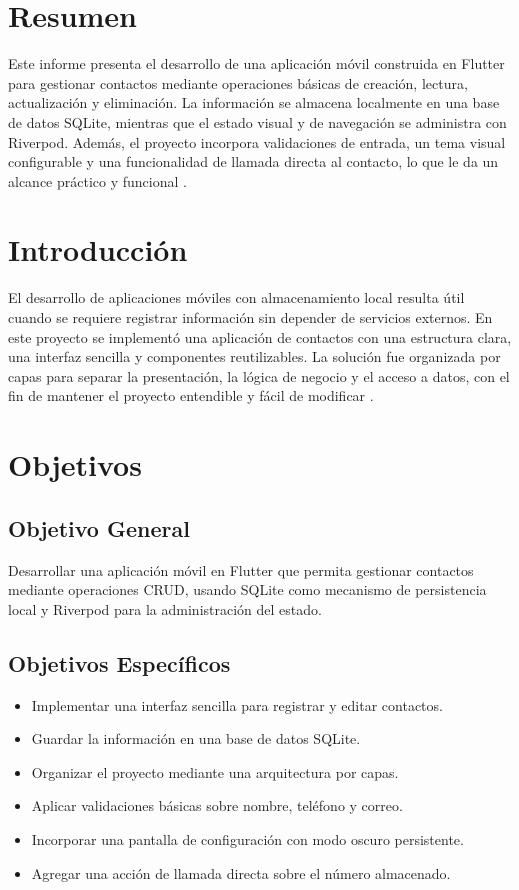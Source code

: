\documentclass[12pt,a4paper]{article}
\begin{document}
\tableofcontents
\newpage
\listoffigures
\newpage

\section{Resumen}
Este informe presenta el desarrollo de una aplicación móvil construida en Flutter para gestionar contactos mediante operaciones básicas de creación, lectura, actualización y eliminación. La información se almacena localmente en una base de datos SQLite, mientras que el estado visual y de navegación se administra con Riverpod. Además, el proyecto incorpora validaciones de entrada, un tema visual configurable y una funcionalidad de llamada directa al contacto, lo que le da un alcance práctico y funcional \citep{flutter,sqlite,riverpod}.

\section{Introducción}
El desarrollo de aplicaciones móviles con almacenamiento local resulta útil cuando se requiere registrar información sin depender de servicios externos. En este proyecto se implementó una aplicación de contactos con una estructura clara, una interfaz sencilla y componentes reutilizables. La solución fue organizada por capas para separar la presentación, la lógica de negocio y el acceso a datos, con el fin de mantener el proyecto entendible y fácil de modificar \citep{flutter,sqlite}.

\section{Objetivos}
\subsection{Objetivo General}
Desarrollar una aplicación móvil en Flutter que permita gestionar contactos mediante operaciones CRUD, usando SQLite como mecanismo de persistencia local y Riverpod para la administración del estado.

\subsection{Objetivos Específicos}
\begin{itemize}[leftmargin=*]
    \item Implementar una interfaz sencilla para registrar y editar contactos.
    \item Guardar la información en una base de datos SQLite.
    \item Organizar el proyecto mediante una arquitectura por capas.
    \item Aplicar validaciones básicas sobre nombre, teléfono y correo.
    \item Incorporar una pantalla de configuración con modo oscuro persistente.
    \item Agregar una acción de llamada directa sobre el número almacenado.
\end{itemize}
\end{document}

